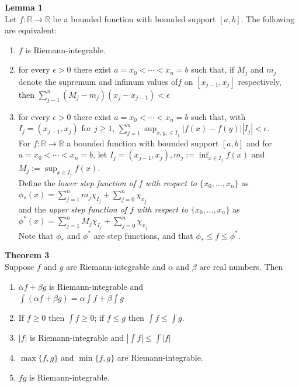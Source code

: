 \documentclass[8pt,landscape]{article}
\begin{document}
\begin{multicols}{3}
    \textbf{Lemma 1} \\
    Let $f : \mathbb{R} \to \mathbb{R}$ be a bounded function with bounded support
    $[a, b]$.
    The following are equivalent:
    \begin{enumerate}
        \item $f$ is Riemann-integrable.
        \item for every $\epsilon > 0$ there exist $a = x_0 < \cdots < x_n = b$ such that,
            if $M_j$ and $m_j$ denote the supremum and infimum values of$f$ on
            $[x_{j-1}, x_j]$ respectively, then
            $\sum_{j-1}^n (M_j - m_j) (x_j - x_{j-1}) < \epsilon$
        \item for every $\epsilon > 0$ there exist $a = x_0 < \cdots < x_n = b$
            such that, with $I_j = (x_{j-1}, x_j)$ for $j \geq 1$,
            $\sum_{j=1}^n \sup_{x, y, \in I_j} |f(x) - f(y)| |I_j| < \epsilon$. \\
            For $f : \mathbb{R} \to \mathbb{R}$ a bounded function with bounded support
            $[a, b]$ and for $a = x_0 < \cdots < x_n = b$,
            let $I_j = (x_{j-1}, x_j), m_j := \inf_{x \in I_j} f(x)$ and
            $M_j := \sup_{x \in I_j} f(x)$. \\
            Define the \emph{lower step function of $f$ with respect to
            $\{x_0, \ldots, x_n\}$} as \\
            $\phi_*(x) = \sum_{j=1}^n m_j \chi_{I_j} + \sum_{j=0}^n \chi_{x_j}$ \\
            and the \emph{upper step function of $f$ with respect to
            $\{x_0, \ldots, x_n\}$} as \\
            $\phi^*(x) = \sum_{j=1}^n M_j \chi_{I_j} + \sum_{j=0}^n \chi_{x_j}$ \\
            Note that $\phi_*$ and $\phi^*$ are step functions, and that
            $\phi_* \leq f \leq \phi^*$.

    \end{enumerate}

    \textbf{Theorem 3} \\
    Suppose $f$ and $g$ are Riemann-integrable and $\alpha$ and $\beta$ are real numbers.
    Then
    \begin{enumerate}
        \item $\alpha f + \beta g$ is Riemann-integrable and \\
            $\int(\alpha f + \beta g) = \alpha \int f + \beta \int g$
        \item If $f \geq 0$ then $\int f \geq 0$; if $f \leq g$ then $\int f \leq \int g$.
        \item $|f|$ is Riemann-integrable and $| \int f| \leq \int |f|$
        \item $\max \{f, g\}$ and $\min \{f, g\}$ are Riemann-integrable.
        \item $fg$ is Riemann-integrable.
    \end{enumerate}


\end{multicols}
\end{document}

